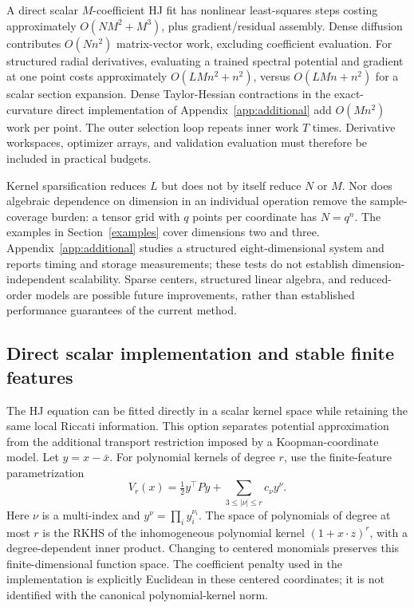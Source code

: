 \documentclass[11pt]{article}
\theoremstyle{plain}      %
\theoremstyle{definition} %
\begin{document}
A direct scalar $M$-coefficient HJ fit has nonlinear least-squares steps costing approximately $O(NM^2+M^3)$, plus gradient/residual assembly. Dense diffusion contributes $O(Nn^2)$ matrix-vector work, excluding coefficient evaluation. For structured radial derivatives, evaluating a trained spectral potential and gradient at one point costs approximately $O(LMn^2+n^2)$, versus $O(LMn+n^2)$ for a scalar section expansion. Dense Taylor-Hessian contractions in the exact-curvature direct implementation of Appendix~\ref{app:additional} add $O(Mn^2)$ work per point. The outer selection loop repeats inner work $T$ times. Derivative workspaces, optimizer arrays, and validation evaluation must therefore be included in practical budgets.

Kernel sparsification reduces $L$ but does not by itself reduce $N$ or $M$. Nor does algebraic dependence on dimension in an individual operation remove the sample-coverage burden: a tensor grid with $q$ points per coordinate has $N=q^n$. The examples in Section~\ref{examples} cover dimensions two and three. Appendix~\ref{app:additional} studies a structured eight-dimensional system and reports timing and storage measurements; these tests do not establish dimension-independent scalability. Sparse centers, structured linear algebra, and reduced-order models are possible future improvements, rather than established performance guarantees of the current method.

\subsection{Direct scalar implementation and stable finite features}\label{sec:direct-implementation}
The HJ equation can be fitted directly in a scalar kernel space while retaining the same local Riccati information. This option separates potential approximation from the additional transport restriction imposed by a Koopman-coordinate model. Let $y=x-\bar x$. For polynomial kernels of degree $r$, use the finite-feature parametrization
\begin{equation}\label{eq:direct-polynomial}
 V_r(x)=\tfrac12y^\top Py+\sum_{3\leq|\nu|\leq r}c_\nu y^\nu.
\end{equation}
Here $\nu$ is a multi-index and $y^\nu=\prod_i y_i^{\nu_i}$. The space of polynomials of degree at most $r$ is the RKHS of the inhomogeneous polynomial kernel $(1+x\cdot z)^r$, with a degree-dependent inner product. Changing to centered monomials preserves this finite-dimensional function space. The coefficient penalty used in the implementation is explicitly Euclidean in these centered coordinates; it is not identified with the canonical polynomial-kernel norm.
\end{document}
